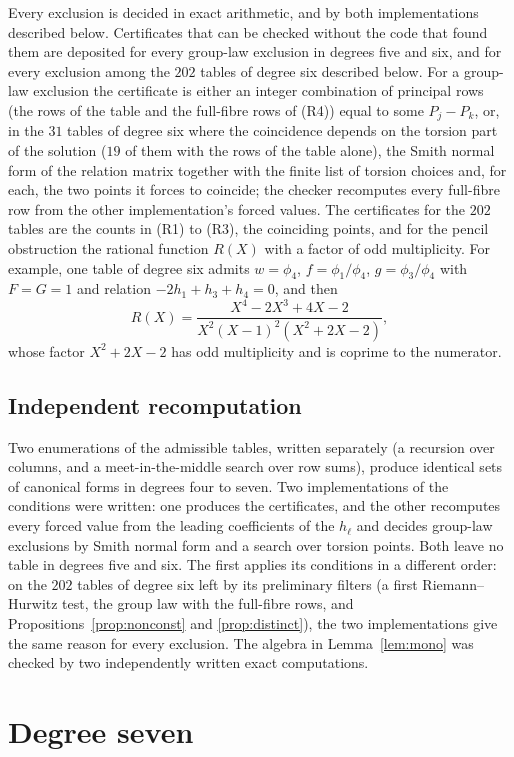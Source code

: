 \documentclass[11pt]{amsart}
\theoremstyle{definition}
\begin{document}
Every exclusion is decided in exact arithmetic, and by both implementations described below. Certificates that can
be checked without the code that found them are deposited for every group-law exclusion in degrees five and six,
and for every exclusion among the $202$ tables of degree six described below. For a group-law exclusion the
certificate is either an integer combination of principal rows (the rows of the table and the full-fibre rows of
(R4)) equal to some $P_j-P_k$, or, in the $31$ tables of degree six where the coincidence depends on the torsion part
of the solution ($19$ of them with the rows of the table alone), the Smith normal form of the relation matrix
together with the finite list of torsion choices and, for each, the two points it forces to coincide; the checker
recomputes every full-fibre row from the other implementation's forced values. The certificates for the $202$ tables
are the counts in (R1) to (R3), the coinciding points, and for the pencil obstruction the rational function $R(X)$
with a factor of odd multiplicity. For example, one table of degree six
admits $w=\phi_4$, $f=\phi_1/\phi_4$, $g=\phi_3/\phi_4$ with $F=G=1$ and relation $-2h_1+h_3+h_4=0$, and then
\[
R(X)=\frac{X^4-2X^3+4X-2}{X^2(X-1)^2(X^2+2X-2)},
\]
whose factor $X^2+2X-2$ has odd multiplicity and is coprime to the numerator.

\subsection*{Independent recomputation}
Two enumerations of the admissible tables, written separately (a recursion over columns, and a meet-in-the-middle
search over row sums), produce identical sets of canonical forms in degrees four to seven. Two implementations of the
conditions were written: one produces the certificates, and the other recomputes every forced value from the leading
coefficients of the $h_\ell$ and decides group-law exclusions by Smith normal form and a search over torsion points.
Both leave no table in degrees five and six. The first applies its conditions in a different order: on the $202$
tables of degree six left by its preliminary filters (a first Riemann--Hurwitz test, the group law with the
full-fibre rows, and Propositions~\ref{prop:nonconst} and \ref{prop:distinct}), the two implementations give the
same reason for every exclusion. The algebra in Lemma~\ref{lem:mono} was checked by two
independently written exact computations.

\section{Degree seven}\label{sec:seven}
\end{document}
